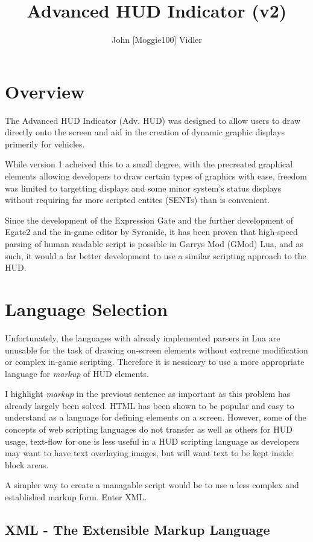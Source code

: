 \documentclass[10pt,a4paper]{article}
\title{Advanced HUD Indicator (v2)}
\author{John [Moggie100] Vidler}
\begin{document}
\maketitle

\tableofcontents

\section{Overview}
The Advanced HUD Indicator (Adv. HUD) was designed to allow users to draw directly onto the screen and aid in the creation of dynamic graphic displays primerily for vehicles.

While version 1 acheived this to a small degree, with the precreated graphical elements allowing developers to draw certain types of graphics with ease, freedom was limited to targetting displays and some minor system's status displays without requiring far more scripted entites (SENTs) than is convenient.

Since the development of the Expression Gate and the further development of Egate2 and the in-game editor by Syranide, it has been proven that high-speed parsing of human readable script is possible in Garrys Mod (GMod) Lua, and as such, it would a far better development to use a similar scripting approach to the HUD.

\section{Language Selection}
Unfortunately, the languages with already implemented parsers in Lua are unusable for the task of drawing on-screen elements without extreme modification or complex in-game scripting.  Therefore it is nessicary to use a more appropriate language for \textit{markup} of HUD elements.

I highlight \textit{markup} in the previous sentence as important as this problem has already largely been solved.  HTML has been shown to be popular and easy to understand as a language for defining elements on a screen.  However, some of the concepts of web scripting languages do not transfer as well as others for HUD usage, text-flow for one is less useful in a HUD scripting language as developers may want to have text overlaying images, but will want text to be kept inside block areas.

A simpler way to create a managable script would be to use a less complex and established markup form.  Enter XML.

\subsection{XML - The Extensible Markup Language}
\end{document}
